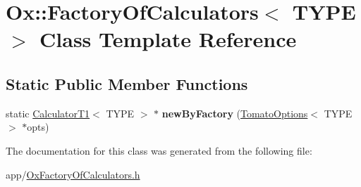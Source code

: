 \hypertarget{class_ox_1_1_factory_of_calculators}{\section{Ox\-:\-:Factory\-Of\-Calculators$<$ T\-Y\-P\-E $>$ Class Template Reference}
\label{class_ox_1_1_factory_of_calculators}
}
\subsection*{Static Public Member Functions}
\begin{DoxyCompactItemize}
\item 
\hypertarget{class_ox_1_1_factory_of_calculators_a898d51ba166e4afaaa730d18e685e93b}{static \hyperlink{class_ox_1_1_calculator_t1}{Calculator\-T1}$<$ T\-Y\-P\-E $>$ $\ast$ {\bfseries new\-By\-Factory} (\hyperlink{struct_ox_1_1_tomato_options}{Tomato\-Options}$<$ T\-Y\-P\-E $>$ $\ast$opts)}\label{class_ox_1_1_factory_of_calculators_a898d51ba166e4afaaa730d18e685e93b}

\end{DoxyCompactItemize}


The documentation for this class was generated from the following file\-:\begin{DoxyCompactItemize}
\item 
app/\hyperlink{_ox_factory_of_calculators_8h}{Ox\-Factory\-Of\-Calculators.\-h}\end{DoxyCompactItemize}
